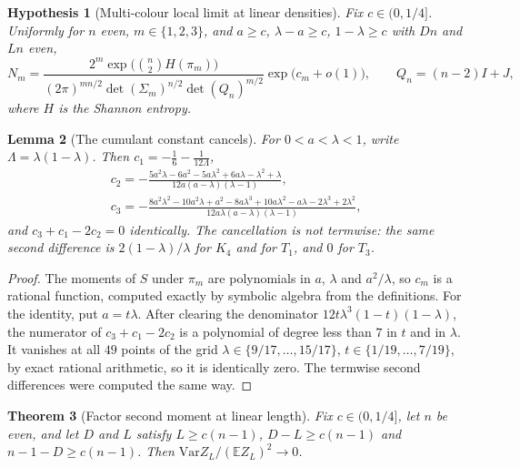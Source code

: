 \documentclass[11pt]{article}
\newtheorem{theorem}{Theorem}
\newtheorem{lemma}[theorem]{Lemma}
\newtheorem{hypothesis}[theorem]{Hypothesis}
\newcommand{\EE}{\mathbb{E}}
\newcommand{\Var}{\mathrm{Var}}
\begin{document}
\begin{hypothesis}[Multi-colour local limit at linear densities]
\label{hyp:mllt}
Fix \(c\in(0,1/4]\). Uniformly for \(n\) even, \(m\in\{1,2,3\}\), and
\(a\ge c\), \(\lambda-a\ge c\), \(1-\lambda\ge c\) with \(Dn\) and \(Ln\) even,
\[
N_m=\frac{2^m\exp\bigl(\binom n2H(\pi_m)\bigr)}
{(2\pi)^{mn/2}\det(\Sigma_m)^{n/2}\det(Q_n)^{m/2}}
\exp\bigl(c_m+o(1)\bigr),
\qquad Q_n=(n-2)I+J,
\]
where \(H\) is the Shannon entropy.
\end{hypothesis}

\begin{lemma}[The cumulant constant cancels]
\label{lem:cumulant-constant}
For \(0<a<\lambda<1\), write \(\varLambda=\lambda(1-\lambda)\). Then
\(c_1=-\frac16-\frac1{12\varLambda}\),
\begin{gather*}
c_2=-\frac{5a^2\lambda-6a^2-5a\lambda^2+6a\lambda-\lambda^2+\lambda}{12a(a-\lambda)(\lambda-1)},
\\
c_3=-\frac{8a^2\lambda^2-10a^2\lambda+a^2-8a\lambda^3+10a\lambda^2-a\lambda-2\lambda^3+2\lambda^2}{12a\lambda(a-\lambda)(\lambda-1)},
\end{gather*}
and \(c_3+c_1-2c_2=0\) identically.
The cancellation is not termwise: the same second difference is
\(2(1-\lambda)/\lambda\) for \(K_4\) and for \(T_1\), and \(0\) for \(T_3\).
\end{lemma}

\begin{proof}
The moments of \(S\) under \(\pi_m\) are polynomials in \(a\), \(\lambda\) and
\(a^2/\lambda\), so \(c_m\) is a rational function, computed exactly by
symbolic algebra from the definitions.
For the identity, put \(a=t\lambda\). After clearing the denominator
\(12t\lambda^3(1-t)(1-\lambda)\), the numerator of \(c_3+c_1-2c_2\) is a
polynomial of degree less than \(7\) in \(t\) and in \(\lambda\).
It vanishes at all \(49\) points of the grid
\(\lambda\in\{9/17,\ldots,15/17\}\), \(t\in\{1/19,\ldots,7/19\}\), by exact rational
arithmetic, so it is identically zero.
The termwise second differences were computed the same way.
\end{proof}

\begin{theorem}[Factor second moment at linear length]
\label{thm:factor-moment-conditional}
Fix \(c\in(0,1/4]\), let \(n\) be even, and let \(D\) and
\(L\) satisfy \(L\ge c(n-1)\), \(D-L\ge c(n-1)\) and \(n-1-D\ge c(n-1)\).
Then \(\Var Z_L/(\EE Z_L)^2\to0\).
\end{theorem}
\end{document}
